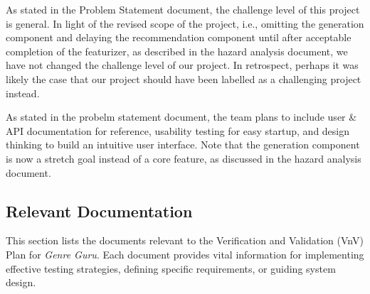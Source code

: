 \documentclass[12pt, titlepage]{article}
\begin{document}
\begin{description}[leftmargin=0cm]
  \item[Challenge Level] As stated in the Problem Statement document, the challenge level of this project is general. In light of the revised scope of the project, i.e., omitting the generation component and delaying the recommendation component until after acceptable completion of the featurizer, as described in the hazard analysis document, we have not changed the challenge level of our project. In retrospect, perhaps it was likely the case that our project should have been labelled as a challenging project instead.
  \item[Extras] As stated in the probelm statement document, the team plans to include user \& API documentation for reference, usability testing for easy startup, and design thinking to build an intuitive user interface. Note that the generation component is now a stretch goal instead of a core feature, as discussed in the hazard analysis document.
\end{description}

\subsection{Relevant Documentation}

This section lists the documents relevant to the Verification and Validation (VnV) Plan for \textit{Genre Guru}. Each document provides vital information for implementing effective testing strategies, defining specific requirements, or guiding system design.
\end{document}
